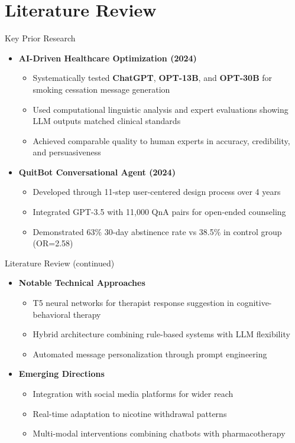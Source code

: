 \section{Literature Review}

\begin{frame}{Key Prior Research}
\begin{itemize}
    \item \textbf{AI-Driven Healthcare Optimization (2024)}
    \begin{itemize}
        \item Systematically tested \textbf{ChatGPT}, \textbf{OPT-13B}, and \textbf{OPT-30B} for smoking cessation message generation
        \item Used computational linguistic analysis and expert evaluations showing LLM outputs matched clinical standards
        \item Achieved comparable quality to human experts in accuracy, credibility, and persuasiveness
    \end{itemize}
    \item \textbf{QuitBot Conversational Agent (2024)}
    \begin{itemize}
        \item Developed through 11-step user-centered design process over 4 years
        \item Integrated GPT-3.5 with 11,000 QnA pairs for open-ended counseling
        \item Demonstrated 63\% 30-day abstinence rate vs 38.5\% in control group (OR=2.58)
    \end{itemize}
\end{itemize}
\end{frame}

\begin{frame}{Literature Review (continued)}
\begin{itemize}
    \item \textbf{Notable Technical Approaches}
    \begin{itemize}
        \item T5 neural networks for therapist response suggestion in cognitive-behavioral therapy
        \item Hybrid architecture combining rule-based systems with LLM flexibility
        \item Automated message personalization through prompt engineering
    \end{itemize}
    \item \textbf{Emerging Directions}
    \begin{itemize}
        \item Integration with social media platforms for wider reach
        \item Real-time adaptation to nicotine withdrawal patterns
        \item Multi-modal interventions combining chatbots with pharmacotherapy
    \end{itemize}
\end{itemize}
\end{frame}


